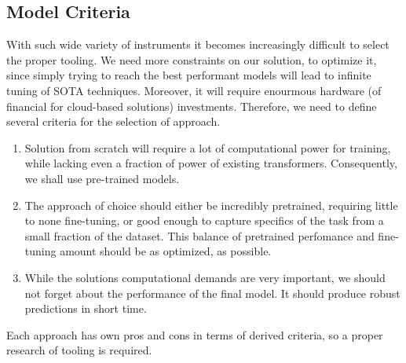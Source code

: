 \subsection{Model Criteria}

With such wide variety of instruments it becomes increasingly difficult to
select the proper tooling. We need more constraints on our solution, to
optimize it, since simply trying to reach the best performant models will lead
to infinite tuning of SOTA techniques. Moreover, it will require enourmous
hardware (of financial for cloud-based solutions) investments. Therefore, we
need to define several criteria for the selection of approach.

\begin{enumerate}
      \item Solution from scratch will require a lot of computational power for training,
            while lacking even a fraction of power of existing transformers. Consequently,
            we shall use pre-trained models.

      \item The approach of choice should either be incredibly pretrained, requiring little
            to none fine-tuning, or good enough to capture specifics of the task from a
            small fraction of the dataset. This balance of pretrained perfomance and
            fine-tuning amount should be as optimized, as possible.

      \item While the solutions computational demands are very important, we should not
            forget about the performance of the final model. It should produce robust
            predictions in short time.
\end{enumerate}

Each approach has own pros and cons in terms of derived criteria, so a proper
research of tooling is required.